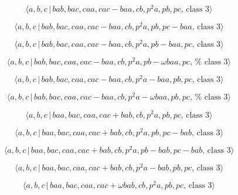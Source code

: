 \documentclass[10pt]{article}
\begin{document}
\begin{equation}
\langle a,b,c\,|\,bab,bac,caa,cac-baa,cb,p^2a,pb,pc,\,\text{class }3\rangle 
\tag{7.2685}
\end{equation}

\begin{equation}
\langle a,b,c\,|\,bab,bac,caa,cac-baa,cb,p^2a,pb,pc-baa,\,\text{class }%
3\rangle  \tag{7.2686}
\end{equation}

\begin{equation}
\langle a,b,c\,|\,bab,bac,caa,cac-baa,cb,p^2a,pb-baa,pc,\,\text{class }%
3\rangle  \tag{7.2687}
\end{equation}

\begin{equation}
\langle a,b,c\,|\,bab,bac,caa,cac-baa,cb,p^{2}a,pb-\omega baa,pc,\,\text{%
class }3\rangle  \tag{7.2688}
\end{equation}

\begin{equation}
\langle a,b,c\,|\,bab,bac,caa,cac-baa,cb,p^2a-baa,pb,pc,\,\text{class }%
3\rangle  \tag{7.2689}
\end{equation}

\begin{equation}
\langle a,b,c\,|\,bab,bac,caa,cac-baa,cb,p^{2}a-\omega baa,pb,pc,\,\text{%
class }3\rangle  \tag{7.2690}
\end{equation}

\begin{equation}
\langle a,b,c\,|\,baa,bac,caa,cac+bab,cb,p^2a,pb,pc,\,\text{class }3\rangle 
\tag{7.2691}
\end{equation}

\begin{equation}
\langle a,b,c\,|\,baa,bac,caa,cac+bab,cb,p^2a,pb,pc-bab,\,\text{class }%
3\rangle  \tag{7.2692}
\end{equation}

\begin{equation}
\langle a,b,c\,|\,baa,bac,caa,cac+bab,cb,p^2a,pb-bab,pc-bab,\,\text{class }%
3\rangle  \tag{7.2693}
\end{equation}

\begin{equation}
\langle a,b,c\,|\,baa,bac,caa,cac+bab,cb,p^2a-bab,pb,pc,\,\text{class }%
3\rangle  \tag{7.2694}
\end{equation}

\begin{equation}
\langle a,b,c\,|\,baa,bac,caa,cac+\omega bab,cb,p^{2}a,pb,pc,\,\text{class }%
3\rangle  \tag{7.2695}
\end{equation}
\end{document}
